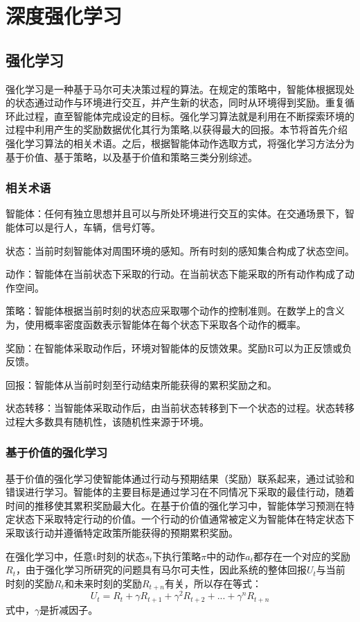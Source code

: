 \chapter{深度强化学习}
\label{chp:initialization}

\section{强化学习}

强化学习是一种基于马尔可夫决策过程的算法。在规定的策略中，智能体根据现处的状态通过动作与环境进行交互，并产生新的状态，同时从环境得到奖励。重复循环此过程，直至智能体完成设定的目标。强化学习算法就是利用在不断探索环境的过程中利用产生的奖励数据优化其行为策略,以获得最大的回报。本节将首先介绍强化学习算法的相关术语。之后，根据智能体动作选取方式，将强化学习方法分为基于价值、基于策略，以及基于价值和策略三类分别综述。
\subsection{相关术语}
智能体：任何有独立思想并且可以与所处环境进行交互的实体。在交通场景下，智能体可以是行人，车辆，信号灯等。

状态：当前时刻智能体对周围环境的感知。所有时刻的感知集合构成了状态空间。

动作：智能体在当前状态下采取的行动。在当前状态下能采取的所有动作构成了动作空间。

策略：智能体根据当前时刻的状态应采取哪个动作的控制准则。在数学上的含义为，使用概率密度函数表示智能体在每个状态下采取各个动作的概率。

奖励：在智能体采取动作后，环境对智能体的反馈效果。奖励R可以为正反馈或负反馈。

回报：智能体从当前时刻至行动结束所能获得的累积奖励之和。

状态转移：当智能体采取动作后，由当前状态转移到下一个状态的过程。状态转移过程大多数具有随机性，该随机性来源于环境。
\subsection{基于价值的强化学习}

基于价值的强化学习使智能体通过行动与预期结果（奖励）联系起来，通过试验和错误进行学习。智能体的主要目标是通过学习在不同情况下采取的最佳行动，随着时间的推移使其累积奖励最大化。在基于价值的强化学习中，智能体学习预测在特定状态下采取特定行动的价值。一个行动的价值通常被定义为智能体在特定状态下采取该行动并遵循特定政策所能获得的预期累积奖励。

在强化学习中，任意t时刻的状态$s_t$下执行策略$\pi$中的动作$a_t$都存在一个对应的奖励$R_t$，由于强化学习所研究的问题具有马尔可夫性，因此系统的整体回报$U_t$与当前时刻的奖励$R_t$和未来时刻的奖励$R_{t+n}$有关，所以存在等式：
\begin{equation}
  \label{eq:2_1}
  U_t = R_t + \gamma R_{t+1} + \gamma^2 R_{t+2} + ... + \gamma^n R_{t+n}
\end{equation}
式中，$\gamma$是折减因子。

